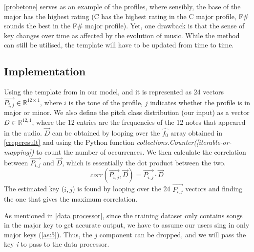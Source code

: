 \cref{probetone} serves as an example of the profiles, where sensibly, the base of the major has the highest rating (C has the highest rating in the C major profile, 
F\# sounds the best in the F\# major profile). 
Yet, one drawback is that the sense of key changes over time as affected by the evolution of music. While the method can still be utilised, the template will have to be
updated from time to time.

\subsection{Implementation}
Using the template from \cite{templatedata} in our model, and it is represented as 24 vectors $\vec{P_{i,j}} \in \mathbb{R}^{12 \times 1}$, 
where $i$ is the tone of the profile, $j$ indicates whether the profile is in major or minor.
We also define the pitch class distribution (our input) as a vector $D \in \mathbb{R}^{12,1}$, where the 12 entries are the frequencies of the 12 notes that appeared in the audio.
$\vec{D}$ can be obtained by looping over the $\hat{f_0}$ array obtained in \cref{creperesult} and using the Python function \emph{collections.Counter([iterable-or-mapping])} to count the
number of occurrences. We then calculate the correlation between $\vec{P_{i,j}}$ and $\vec{D}$, which is essentially the dot product between the two.
\[ corr(\vec{P_{i,j}},\vec{D}) = \vec{P_{i,j}} \cdot \vec{D} \]
The estimated key ($i,j$) is found by looping over the 24 $\vec{P_{i,j}}$ vectors and finding the one that gives the maximum correlation.

As mentioned in \cref{data processor}, since the training dataset only contains songs in the major key to get accurate output, we have to assume our users sing in only
major keys (\cref{as:5}). Thus, the $j$ component can be dropped, and we will pass the key \emph{i} to pass to the data processor.

